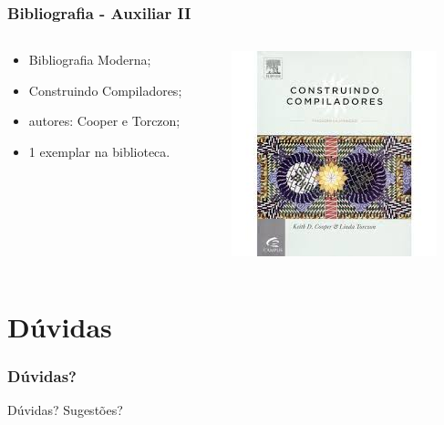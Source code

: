 \documentclass[table]{beamer}
\begin{document}
\begin{frame}
   \frametitle{Bibliografia - Auxiliar II}
   \begin{columns}
      \begin{column}{0.5\textwidth}
         \begin{itemize}
	    \item Bibliografia Moderna;
	    \item Construindo Compiladores;
	    \item autores: Cooper e Torczon;
	    \item 1 exemplar na biblioteca.
	 \end{itemize}
      \end{column}
      \begin{column}{0.5\textwidth}
      \includegraphics[scale=0.8]{figuras/livro_construindo.jpg}
      \end{column}
   \end{columns}
\end{frame}

\section{Dúvidas}
\begin{frame}
   \frametitle{Dúvidas?}
   Dúvidas? Sugestões?
\end{frame}
\end{document}
